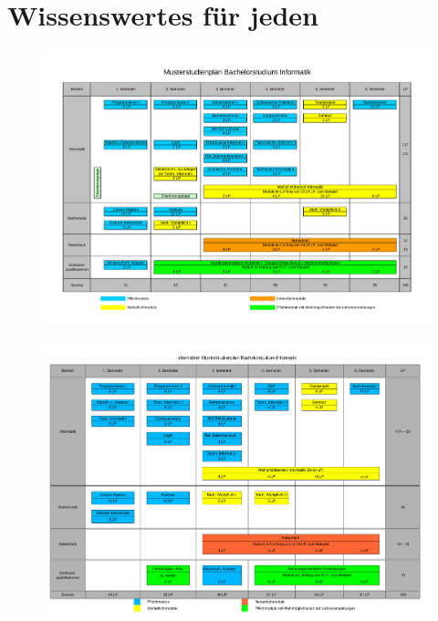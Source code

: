 \section{Wissenswertes für jeden}









\onecolumn
\label{musterstudienplan}
\begin{figure}[h]
  \centering\includegraphics[angle=90,totalheight=\textheight, width=\textwidth ]{texte/bachelor/studienplan.pdf}
\end{figure}
\twocolumn
\onecolumn
\label{studienplan_neu}
\begin{figure}[h]
  \centering\includegraphics[angle=90,totalheight=\textheight, width=\textwidth ]{texte/bachelor/studienplan_neu.pdf}
\end{figure}
\twocolumn
